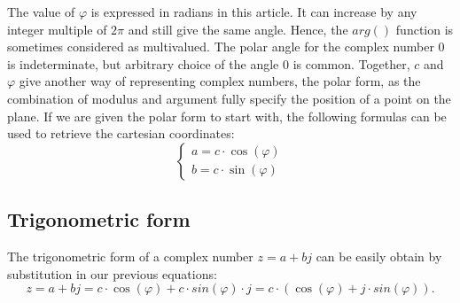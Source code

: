 \documentclass[12pt,oneside,openany]{memoir}
\numberwithin{equation}{subsection}
\begin{document}
The value of \(\varphi\) is expressed in radians in this article. It can increase by any integer multiple of \(2\pi\) and still give the same angle. Hence, the \(arg()\) function is sometimes considered as multivalued. The polar angle for the complex number 0 is indeterminate, but arbitrary choice of the angle 0 is common. Together, \(c\) and \(\varphi\) give another way of representing complex numbers, the polar form, as the combination of modulus and argument fully specify the position of a point on the plane.
\bigbreak
If we are given the polar form to start with, the following formulas can be used to retrieve the cartesian coordinates:
\[
	\begin{cases}
		a = c \cdot \cos(\varphi)\\
		b = c \cdot \sin(\varphi)
	\end{cases}
\]

\subsection{Trigonometric form}
The trigonometric form of a complex number \(z = a + bj\) can be easily obtain by substitution in our previous equations:
\[
	z = a + bj = c \cdot \cos(\varphi) + c \cdot sin(\varphi) \cdot j = c \cdot (\cos(\varphi) + j \cdot sin(\varphi)).
\]
\end{document}
